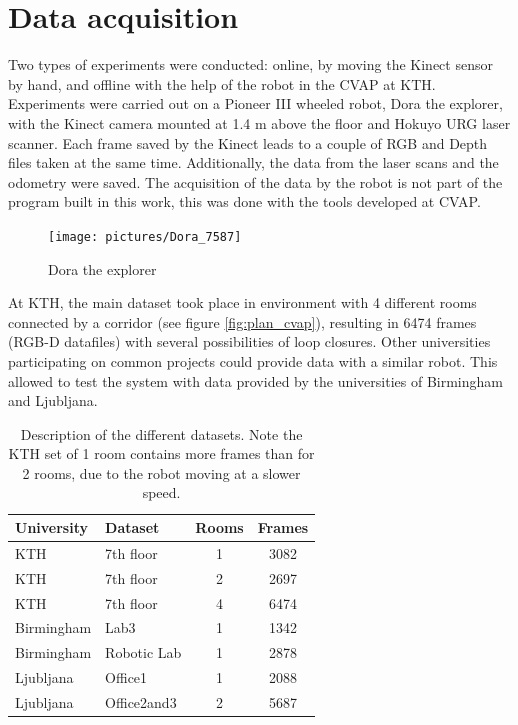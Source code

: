 \clearpage

\section{Data acquisition}

Two types of experiments were conducted: online, by moving the Kinect sensor by hand, and offline with the help of the robot in the \gls{CVAP} at KTH. Experiments were carried out on a Pioneer III wheeled robot, Dora the explorer, with the Kinect camera mounted at 1.4 m above the floor and Hokuyo URG laser scanner. Each frame saved by the Kinect leads to a couple of RGB and Depth files taken at the same time. Additionally, the data from the laser scans and the odometry were saved. The acquisition of the data by the robot is not part of the program built in this work, this was done with the tools developed at \gls{CVAP}.

\begin{figure}[h]
 \begin{center}
 \texttt{[image: pictures/Dora\_7587]}
 \end{center}
\caption{Dora the explorer}
\end{figure}

\clearpage
At KTH, the main dataset took place in environment with 4 different rooms connected by a corridor (see figure \ref{fig:plan_cvap}), resulting in 6474 frames (RGB-D datafiles) with several possibilities of loop closures. Other universities participating on common projects could provide data with a similar robot. This allowed to test the system with data provided by the universities of Birmingham and Ljubljana.

\begin{table}[H]
 \begin{center}
  \begin{tabular}{llcc}
  \hline
  University & Dataset & Rooms & Frames \\
  \hline
  KTH & 7th floor & 1 & 3082 \\
  KTH & 7th floor & 2 & 2697 \\
  KTH & 7th floor & 4 & 6474 \\
  Birmingham & Lab3 & 1 & 1342 \\
  Birmingham & Robotic Lab & 1 & 2878 \\
  Ljubljana & Office1 & 1 & 2088 \\
  Ljubljana & Office2and3 & 2 & 5687 \\
  \hline
  \end{tabular}
 \end{center}
 \caption{Description of the different datasets. Note the KTH set of 1 room contains more frames than for 2 rooms, due to the robot moving at a slower speed.}
\end{table}


